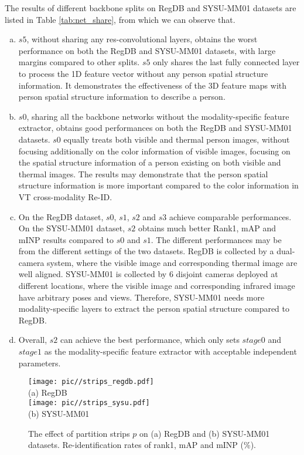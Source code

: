 \documentclass[journal]{IEEEtran}
\begin{document}
The results of different backbone splits on RegDB and SYSU-MM01 datasets are listed in Table \ref{tab:net_share}, from which we can observe that.
\begin{enumerate}[a)]
  \item $s5$, without sharing any res-convolutional layers, obtains the worst performance on both the RegDB and SYSU-MM01 datasets, with large margins compared to other splits. $s5$ only shares the last fully connected layer to process the 1D feature vector without any person spatial structure information. It demonstrates the effectiveness of the 3D feature maps with person spatial structure information to describe a person.
  \item $s0$, sharing all the backbone networks without the modality-specific feature extractor, obtains good performances on both the RegDB and SYSU-MM01 datasets. $s0$ equally treats both visible and thermal person images, without focusing additionally on the color information of visible images, focusing on the spatial structure information of a person existing on both visible and thermal images. The results may demonstrate that the person spatial structure information is more important compared to the color information in VT cross-modality Re-ID.
  \item On the RegDB dataset, $s0$, $s1$, $s2$ and $s3$ achieve comparable performances. On the SYSU-MM01 dataset, $s2$ obtains much better Rank1, mAP and mINP results compared to $s0$ and $s1$. The different performances may be from the different settings of the two datasets. RegDB is collected by a dual-camera system, where the visible image and corresponding thermal image are well aligned. SYSU-MM01 is collected by 6 disjoint cameras deployed at different locations, where the visible image and corresponding infrared image have arbitrary poses and views. Therefore, SYSU-MM01 needs more modality-specific layers to extract the person spatial structure compared to RegDB.
  \item Overall, $s2$ can achieve the best performance, which only sets $stage0$ and $stage1$ as the modality-specific feature extractor with acceptable independent parameters.
\end{enumerate}

\begin{figure}
\centering
\texttt{[image: pic//strips\_regdb.pdf]} \\ (a) RegDB \\
\texttt{[image: pic//strips\_sysu.pdf]} \\  (b) SYSU-MM01
\caption{The effect of partition strips $p$ on (a) RegDB and (b) SYSU-MM01 datasets. Re-identification rates of rank1, mAP and mINP (\%).}
\label{fig:strips}
\end{figure}
\end{document}
